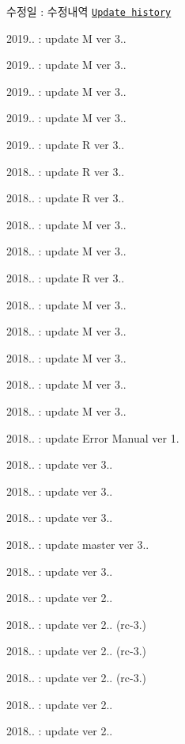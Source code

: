 \begin{DoxyItemize}
\item 수정일 \-: 수정내역 \href{file:md_CuiHistory.html}{\tt Update history}
\item 2019.. \-: update M ver 3..
\item 2019.. \-: update M ver 3..
\item 2019.. \-: update M ver 3..
\item 2019.. \-: update M ver 3..
\item 2019.. \-: update R ver 3..
\item 2018.. \-: update R ver 3..
\item 2018.. \-: update R ver 3..
\item 2018.. \-: update M ver 3..
\item 2018.. \-: update M ver 3..
\item 2018.. \-: update R ver 3..
\item 2018.. \-: update M ver 3..
\item 2018.. \-: update M ver 3..
\item 2018.. \-: update M ver 3..
\item 2018.. \-: update M ver 3..
\item 2018.. \-: update M ver 3..
\item 2018.. \-: update Error Manual ver 1.
\item 2018.. \-: update ver 3..
\item 2018.. \-: update ver 3..
\item 2018.. \-: update ver 3..
\item 2018.. \-: update master ver 3..
\item 2018.. \-: update ver 3..
\item 2018.. \-: update ver 2..
\item 2018.. \-: update ver 2.. (rc-\/3.)
\item 2018.. \-: update ver 2.. (rc-\/3.)
\item 2018.. \-: update ver 2.. (rc-\/3.)
\item 2018.. \-: update ver 2..
\item 2018.. \-: update ver 2..

\end{DoxyItemize}
